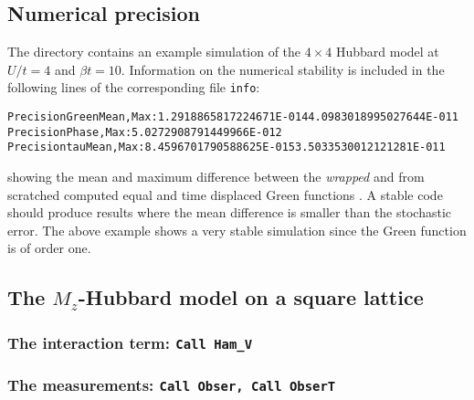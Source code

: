 \subsection{Numerical precision}\label{sec:prec_charge}
The directory   contains an example simulation of the $4 \times 4$ Hubbard model at $U/t=4$ and $\beta t = 10$. 
Information on the numerical stability is included in the following lines of the corresponding file \texttt{info}:
\begin{alltt}
Precision Green  Mean, Max :    1.2918865817224671E-014   4.0983018995027644E-011
Precision Phase, Max       :    5.0272908791449966E-012
Precision tau    Mean, Max :    8.4596701790588625E-015   3.5033530012121281E-011
\end{alltt}
showing the mean and maximum difference between the \textit{wrapped}  and from scratched computed equal and time displaced  Green functions \cite{Assaad08_rev}.
A stable code  should produce results where the mean difference is smaller than the  stochastic error. The above example  shows a very stable  simulation since the Green function  is of order one. 


\subsection{The $M_z$-Hubbard model on a square lattice}\label{sec:walk1.1}

\subsubsection{The interaction term: \texttt{Call Ham\_V} } 


 \subsubsection{The  measurements: \texttt{Call Obser, Call  ObserT} } 

